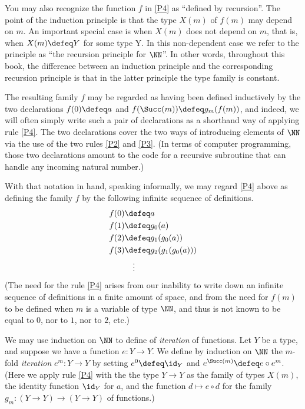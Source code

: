 You may also recognize the function $f$ in \ref{P4} as ``defined by recursion''.
The point of the induction principle is that the type $X(m)$ of
$f(m)$ may depend on $m$. An important special case is when $X(m)$
does not depend on $m$, that is, when $X(m)\defeq Y$ for some type Y.
In this non-dependent case we refer to the principle as
``the recursion principle for $\NN$''. In other words, throughout
this book, the difference between an induction principle and the
corresponding recursion principle is that in the latter principle
the type family is constant.


The resulting family $f$ may be regarded as having been defined inductively
by the two declarations $f(0) \defeq a$ and $f(\Succ(m)) \defeq g_m(f(m))$,
and indeed, we will often simply write such a pair of declarations as a shorthand way of applying rule \ref{P4}.
The two declarations cover the two ways of introducing elements of $\NN$ via the use of the two rules \ref{P2} and \ref{P3}.
(In terms of computer programming, those two declarations amount to the code for a recursive subroutine that can handle any incoming natural number.)

With that notation in hand, speaking informally, we may regard \ref{P4} above as defining the family $f$ by the following infinite sequence of definitions.
\begin{align*}
  f(0) & \defeq a \\
  f(1) & \defeq g_0(a) \\
  f(2) & \defeq g_1(g_0(a)) \\
  f(3) & \defeq g_2(g_1(g_0(a))) \\
  & \quad \vdots
\end{align*}
(The need for the rule \ref{P4} arises from our inability to write down an infinite sequence of definitions in a finite amount of space, and
from the need for $f(m)$ to be defined when $m$ is a variable of type $\NN$, and thus is not known to be equal to $0$, nor to $1$, nor to $2$,
etc.)

We may use induction on $\NN$ to define of \emph{iteration} of functions.  Let $Y$ be a type, and suppose we have a function $e : Y \to Y$.  We
define by induction on $\NN$ the $m$-fold \emph{iteration} $e^m : Y \to Y$ by setting $e^0 \defeq \id_Y$ and $e^{\Succ(m)}\defeq e\circ e^m$.
(Here we apply rule \ref{P4} with the the type $Y \to Y$ as the family of types $X(m)$, the identity function $\id_Y$ for $a$, and the function
$d \mapsto e\circ d$ for the family $g_m : (Y\to Y)\to(Y\to Y)$ of functions.)

